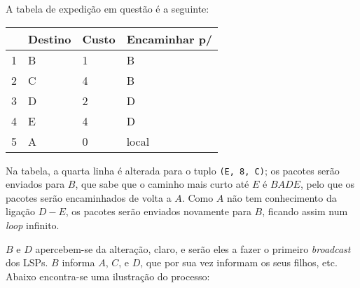\begin{enumerate}[leftmargin=\labelsep]
        \begin{figure}[H]
          \centering
          
        \end{figure}

        A tabela de expedição em questão é a seguinte:

        \begin{table}[H]
          \centering
          \begin{tabular}{l|l|l|l}
              & Destino & Custo & Encaminhar p/ \\ \hline
            1 & B       & 1     & B             \\
            2 & C       & 4     & B             \\
            3 & D       & 2     & D             \\
            4 & E       & 4     & D             \\
            5 & A       & 0     & local
          \end{tabular}
        \end{table}


        Na tabela, a quarta linha é alterada para o tuplo \texttt{(E, 8, C)}; os pacotes
        serão enviados para $B$, que sabe que o caminho mais curto até $E$ é $BADE$,
        pelo que os pacotes serão encaminhados de volta a $A$. Como $A$ não tem conhecimento
        da ligação $D-E$, os pacotes serão enviados novamente para $B$, ficando
        assim num \textit{loop} infinito.


        $B$ e $D$ apercebem-se da alteração, claro, e serão eles a fazer o primeiro
        \textit{broadcast} dos LSPs. $B$ informa $A$, $C$, e $D$, que por sua vez informam
        os seus filhos, etc. Abaixo encontra-se uma ilustração do processo:

        \begin{figure}[H]
          \centering
          
        \end{figure}

\end{enumerate}